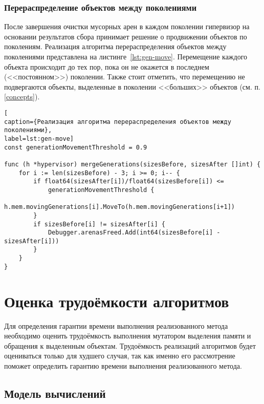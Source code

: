 \subsubsection{Перераспределение объектов между поколениями}

После завершения очистки мусорных арен в каждом поколении гипервизор на основании результатов сбора принимает решение о продвижении объектов по поколениям. Реализация алгоритма перераспределения объектов между поколениями представлена на листинге~\ref{lst:gen-move}. Перемещение каждого объекта происходит до тех пор, пока он не окажется в последнем (<<постоянном>>) поколении. Также стоит отметить, что перемещению не подвергаются объекты, выделенные в поколении <<больших>> объектов (см. п. \ref{concepts}).

\begin{lstlisting}[
caption={Реализация алгоритма перераспределения объектов между поколениями},
label=lst:gen-move]
const generationMovementThreshold = 0.9

func (h *hypervisor) mergeGenerations(sizesBefore, sizesAfter []int) {
	for i := len(sizesBefore) - 3; i >= 0; i-- {
		if float64(sizesAfter[i])/float64(sizesBefore[i]) <=
			generationMovementThreshold {
			h.mem.movingGenerations[i].MoveTo(h.mem.movingGenerations[i+1])
		}
		if sizesBefore[i] != sizesAfter[i] {
			Debugger.arenasFreed.Add(int64(sizesBefore[i] - sizesAfter[i]))
		}
	}
}
\end{lstlisting}


\section{Оценка трудоёмкости алгоритмов}

Для определения гарантии времени выполнения реализованного метода необходимо оценить трудоёмкость выполнения мутатором выделения памяти и обращения к выделенным объектам. Трудоёмкость реализаций алгоритмов будет оцениваться только для худшего случая, так как именно его рассмотрение поможет определить гарантию времени выполнения реализованного метода.

\subsection{Модель вычислений}

